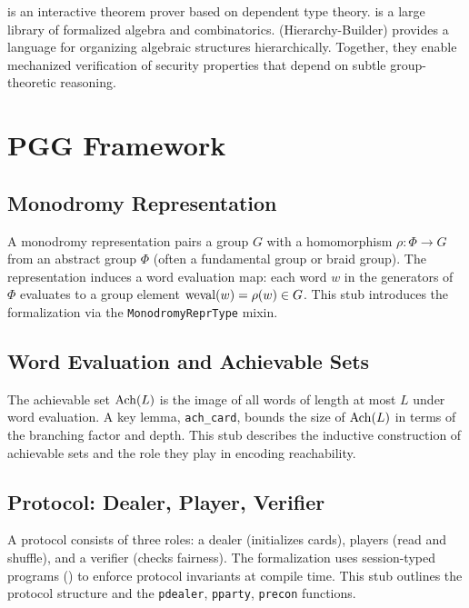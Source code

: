 \documentclass[11pt,a4paper]{article}
\begin{document}
\Rocq is an interactive theorem prover based on dependent type theory.
\MathComp is a large library of formalized algebra and combinatorics.
\HB (Hierarchy-Builder) provides a language for organizing algebraic structures hierarchically.
Together, they enable mechanized verification of security properties that depend on subtle group-theoretic reasoning.

\section{PGG Framework}
\label{sec:pgg}

\subsection{Monodromy Representation}
\label{sec:pgg-mono}

A monodromy representation pairs a group $G$ with a homomorphism $\rho : \Phi \to G$ from an abstract group $\Phi$ (often a fundamental group or braid group).
The representation induces a word evaluation map: each word $w$ in the generators of $\Phi$ evaluates to a group element $\mathrm{weval}(w) = \rho(w) \in G$.
This stub introduces the \Rocq formalization via the \texttt{MonodromyReprType} mixin.

\subsection{Word Evaluation and Achievable Sets}
\label{sec:pgg-weval}

The achievable set $\mathrm{Ach}(L)$ is the image of all words of length at most $L$ under word evaluation.
A key lemma, \texttt{ach\_card}, bounds the size of $\mathrm{Ach}(L)$ in terms of the branching factor and depth.
This stub describes the inductive construction of achievable sets and the role they play in encoding reachability.

\subsection{Protocol: Dealer, Player, Verifier}
\label{sec:pgg-protocol}

A \pgg protocol consists of three roles: a dealer (initializes cards), players (read and shuffle), and a verifier (checks fairness).
The formalization uses session-typed programs (\piSMC) to enforce protocol invariants at compile time.
This stub outlines the protocol structure and the \texttt{pdealer}, \texttt{pparty}, \texttt{precon} functions.
\end{document}
